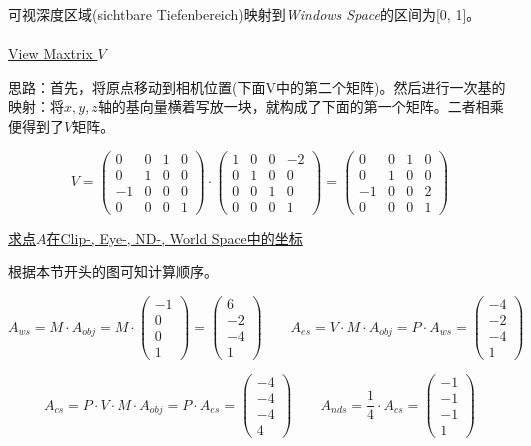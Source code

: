 \documentclass[fleqn]{article}
\begin{document}
\noindent 可视深度区域(sichtbare Tiefenbereich)映射到\textit{Windows Space}的区间为[0, 1]。
\\
\\
\underline{View Maxtrix $V$}

思路：首先，将原点移动到相机位置(下面V中的第二个矩阵)。然后进行一次基的映射：将$x,y,z$轴的基向量横着写放一块，就构成了下面的第一个矩阵。二者相乘便得到了$V$矩阵。

$$V = 
\begin{pmatrix}
    0 & 0 & 1 & 0 \\
    0 & 1 & 0 & 0 \\
    -1 & 0 & 0 &0 \\
    0 & 0 & 0 & 1
\end{pmatrix} \cdot
\begin{pmatrix}
    1 & 0 & 0 & -2 \\
    0 & 1 & 0 & 0 \\
    0 & 0 & 1 & 0 \\
    0 & 0 & 0 & 1
\end{pmatrix} = 
\begin{pmatrix}
    0 & 0 & 1 & 0 \\
    0 & 1 & 0 & 0 \\
    -1 & 0 & 0 & 2 \\
    0 & 0 & 0 & 1
\end{pmatrix}
$$

\noindent\underline{求点$A$在Clip-, Eye-, ND-, World Space中的坐标}

根据本节开头的图可知计算顺序。

$$A_{ws} = M \cdot A_{obj} = M \cdot \begin{pmatrix} -1 \\ 0 \\ 0 \\ 1 \end{pmatrix} = \begin{pmatrix} 6 \\ -2 \\ -4 \\ 1 \end{pmatrix}\qquad
A_{es} = V \cdot M \cdot A_{obj} = P \cdot A_{ws} =  \begin{pmatrix} -4 \\ -2 \\ -4 \\ 1 \end{pmatrix}$$

$$A_{cs} = P \cdot V \cdot M \cdot A_{obj} = P \cdot A_{es} = \begin{pmatrix} -4 \\ -4 \\ -4 \\ 4 \end{pmatrix}
\qquad A_{nds} = \frac{1}{4} \cdot A_{cs} = \begin{pmatrix} -1 \\ -1 \\ -1 \\ 1 \end{pmatrix}$$
\end{document}
